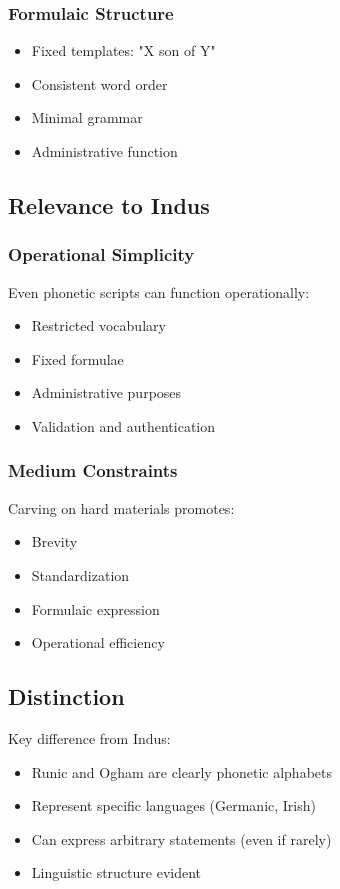 \subsubsection{Formulaic Structure}
\begin{itemize}
    \item Fixed templates: "X son of Y"
    \item Consistent word order
    \item Minimal grammar
    \item Administrative function
\end{itemize}

\subsection{Relevance to Indus}

\subsubsection{Operational Simplicity}
Even phonetic scripts can function operationally:
\begin{itemize}
    \item Restricted vocabulary
    \item Fixed formulae
    \item Administrative purposes
    \item Validation and authentication
\end{itemize}

\subsubsection{Medium Constraints}
Carving on hard materials promotes:
\begin{itemize}
    \item Brevity
    \item Standardization
    \item Formulaic expression
    \item Operational efficiency
\end{itemize}

\subsection{Distinction}

Key difference from Indus:
\begin{itemize}
    \item Runic and Ogham are clearly phonetic alphabets
    \item Represent specific languages (Germanic, Irish)
    \item Can express arbitrary statements (even if rarely)
    \item Linguistic structure evident
\end{itemize}

